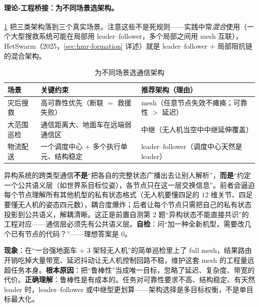 \paragraph{理论-工程桥接：为不同场景选架构。}
\cref{tab:hmr-comm-scenario} 把三类架构落到三个真实场景。注意这些不是死规则——实践中常\emph{混合}使用（一个大型搜救系统可能在局部用 leader--follower，多个局部之间用 mesh 互联），HetSwarm（2025，\cref{sec:hmr-formation} 详述）就是 leader--follower $+$ 局部阻抗链的混合架构。

\begin{table}[H]\centering\small
\caption{为不同场景选通信架构}
\label{tab:hmr-comm-scenario}
\begin{tabular}{lll}
\toprule
场景 & 关键约束 & 推荐架构（理由） \\
\midrule
灾后搜救 & 高可靠性优先（断联 $=$ 救援失败） & mesh（任意节点失效不瘫痪；可靠性 $>$ 延迟） \\
大范围巡检 & 通信距离大、地面车在远端弱通信区 & 中继（无人机当空中中继延伸覆盖） \\
物流配送 & 一个调度中心 $+$ 多个执行单元、结构稳定 & leader--follower（调度中心天然是 leader） \\
\bottomrule
\end{tabular}
\end{table}

\begin{pitfall}
异构系统的跨类型通信\textbf{不是}“把各自的完整状态广播出去让别人解析”，\textbf{而是}“约定一个公共语义层（如世界系目标位姿），各节点只在这一层交换信息”。前者会逼迫每个节点理解所有其他机型的私有状态格式（无人机要懂四足的 $12$ 维关节、四足要懂无人机的姿态四元数），耦合度爆炸；后者让每个节点只需把自己的私有状态投影到公共语义，解耦清晰。这正是前置自测第 $2$ 题“异构状态不能直接共识”的工程对应——通信层必须先有公共语义层。\textbf{自检}：问“加一种全新机型，需要改几个已有节点的代码？”——理想答案是 $0$。
\end{pitfall}

\begin{pitfall}
\textbf{现象}：在“一台强地面车 $+$ $3$ 架轻无人机”的简单巡检里上了 full mesh，结果路由开销吃掉大量带宽、延迟抖动让无人机控制回路不稳，维护这套 mesh 的工程量远超任务本身。\textbf{根本原因}：把“鲁棒性”当成唯一目标，忽略了延迟、复杂度、带宽的代价。\textbf{正确理解}：鲁棒性是有成本的。任务对可靠性要求不高、结构稳定、有天然 leader 时，leader--follower 或中继型更划算——架构选择是多目标权衡，不是单目标最大化。
\end{pitfall}


